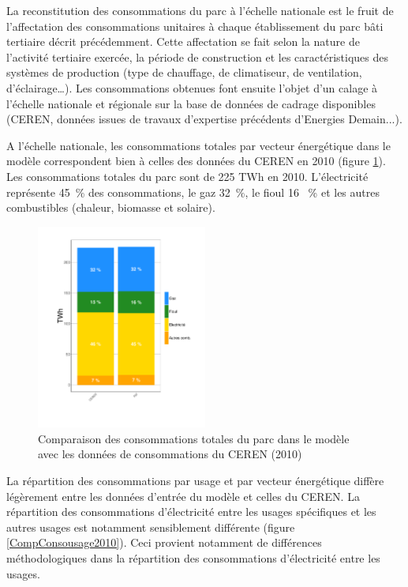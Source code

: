 \documentclass[10.5pt,a4paper]{article}
\begin{document}
{La reconstitution des consommations du parc à l'échelle nationale est le fruit de l’affectation des consommations unitaires à chaque établissement du parc bâti tertiaire décrit précédemment. Cette affectation se fait selon la nature de l’activité tertiaire exercée, la période de construction et les caractéristiques des systèmes de production (type de chauffage, de climatiseur, de ventilation, d’éclairage…). Les consommations obtenues font ensuite l’objet d’un calage à l’échelle nationale et régionale sur la base de données de cadrage disponibles (CEREN, données issues de travaux d'expertise précédents d'Energies Demain...). 

A l'échelle nationale, les consommations totales par vecteur énergétique dans le modèle correspondent bien à celles des données du CEREN en 2010 (figure \ref{CompConsoTot2010}).  Les consommations totales du parc sont de 225 TWh en 2010. L'électricité représente 45~\% des consommations, le gaz 32~\%, le fioul 16 ~\% et les autres combustibles (chaleur, biomasse et solaire). 
 
\begin{figure}[ht]
\centering
\caption{Comparaison des consommations totales du parc dans le modèle avec les données de consommations du CEREN (2010) }\label{CompConsoTot2010}
\includegraphics[width = 0.5\textwidth]{CompConsoTot2010}
\end{figure}

La répartition des consommations par usage et par vecteur énergétique diffère légèrement entre les données d'entrée du modèle et celles du CEREN. La répartition des consommations d'électricité entre les usages spécifiques et les autres usages est notamment sensiblement différente (figure \ref{CompConsousage2010}). Ceci provient notamment de différences méthodologiques dans la répartition des consommations d'électricité entre les usages. 

}
\end{document}
